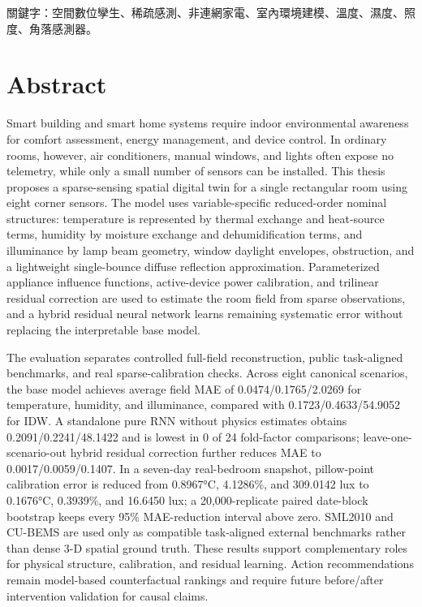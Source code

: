 \documentclass[12pt,a4paper]{article}
\begin{document}
關鍵字：空間數位孿生、稀疏感測、非連網家電、室內環境建模、溫度、濕度、照度、角落感測器。


\clearpage

\section*{Abstract}

Smart building and smart home systems require indoor environmental awareness for comfort assessment, energy management, and device control. In ordinary rooms, however, air conditioners, manual windows, and lights often expose no telemetry, while only a small number of sensors can be installed. This thesis proposes a sparse-sensing spatial digital twin for a single rectangular room using eight corner sensors. The model uses variable-specific reduced-order nominal structures: temperature is represented by thermal exchange and heat-source terms, humidity by moisture exchange and dehumidification terms, and illuminance by lamp beam geometry, window daylight envelopes, obstruction, and a lightweight single-bounce diffuse reflection approximation. Parameterized appliance influence functions, active-device power calibration, and trilinear residual correction are used to estimate the room field from sparse observations, and a hybrid residual neural network learns remaining systematic error without replacing the interpretable base model.


The evaluation separates controlled full-field reconstruction, public task-aligned benchmarks, and real sparse-calibration checks. Across eight canonical scenarios, the base model achieves average field MAE of 0.0474/0.1765/2.0269 for temperature, humidity, and illuminance, compared with 0.1723/0.4633/54.9052 for IDW. A standalone pure RNN without physics estimates obtains 0.2091/0.2241/48.1422 and is lowest in 0 of 24 fold-factor comparisons; leave-one-scenario-out hybrid residual correction further reduces MAE to 0.0017/0.0059/0.1407. In a seven-day real-bedroom snapshot, pillow-point calibration error is reduced from 0.8967°C, 4.1286\%, and 309.0142 lux to 0.1676°C, 0.3939\%, and 16.6450 lux; a 20,000-replicate paired date-block bootstrap keeps every 95\% MAE-reduction interval above zero. SML2010 and CU-BEMS are used only as compatible task-aligned external benchmarks rather than dense 3-D spatial ground truth. These results support complementary roles for physical structure, calibration, and residual learning. Action recommendations remain model-based counterfactual rankings and require future before/after intervention validation for causal claims.
\end{document}
